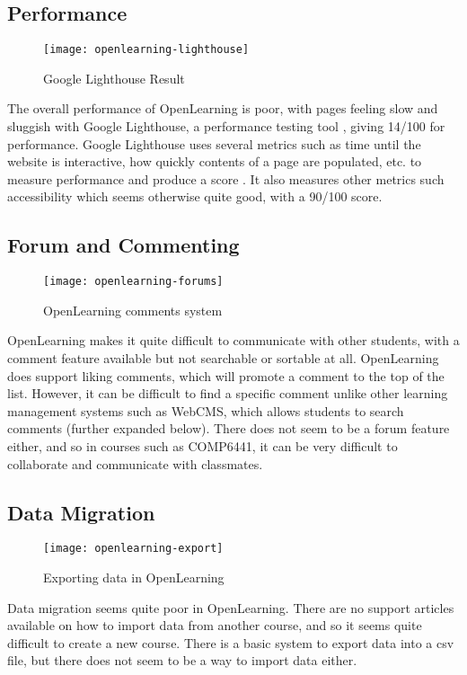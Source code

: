 \subsection{Performance}
\begin{figure}[h!]
    \centering
    \texttt{[image: openlearning-lighthouse]}
    \caption{Google Lighthouse Result}
\end{figure}
The overall performance of OpenLearning is poor, with pages feeling slow and sluggish with Google Lighthouse, a performance testing tool \cite{googleLighthouse}, giving 14/100 for performance. Google Lighthouse uses several metrics such as time until the website is interactive, how quickly contents of a page are populated, etc. to measure performance and produce a score \cite{googleLighthouseMetrics}. It also measures other metrics such accessibility which seems otherwise quite good, with a 90/100 score. \\

\subsection{Forum and Commenting}
\begin{figure}[h!]
    \centering
    \texttt{[image: openlearning-forums]}
    \caption{OpenLearning comments system}
\end{figure}
OpenLearning makes it quite difficult to communicate with other students, with a comment feature available but not searchable or sortable at all. OpenLearning does support liking comments, which will promote a comment to the top of the list. However, it can be difficult to find a specific comment unlike other learning management systems such as WebCMS, which allows students to search comments (further expanded below). There does not seem to be a forum feature either, and so in courses such as COMP6441, it can be very difficult to collaborate and communicate with classmates. \\


\subsection{Data Migration}
\begin{figure}[h!]
    \centering
    \texttt{[image: openlearning-export]}
    \caption{Exporting data in OpenLearning}
\end{figure}
Data migration seems quite poor in OpenLearning. There are no support articles available on how to import data from another course, and so it seems quite difficult to create a new course. There is a basic system to export data into a csv file\cite{openlearningCsv}, but there does not seem to be a way to import data either.

